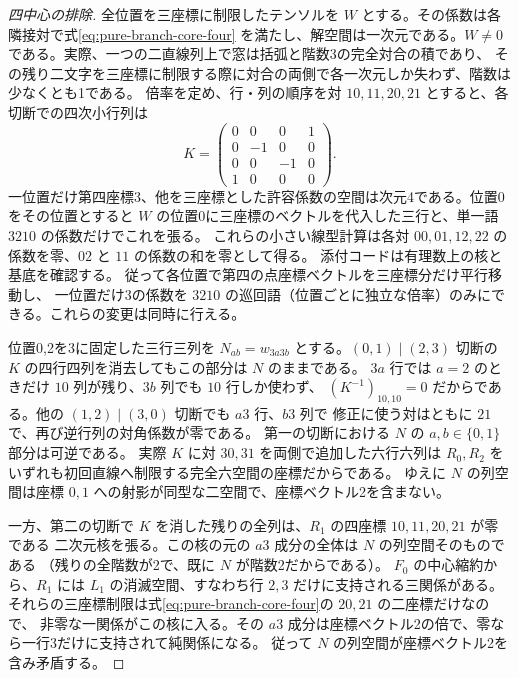 \begin{proof}[四中心の排除]
全位置を三座標に制限したテンソルを $W$ とする。その係数は各隣接対で式\eqref{eq:pure-branch-core-four}
を満たし、解空間は一次元である。$W\ne0$ である。実際、一つの二直線列上で窓は括弧と階数3の完全対合の積であり、
その残り二文字を三座標に制限する際に対合の両側で各一次元しか失わず、階数は少なくとも1である。
倍率を定め、行・列の順序を対 $10,11,20,21$ とすると、各切断での四次小行列は
\[
 K=\begin{pmatrix}0&0&0&1\\0&-1&0&0\\0&0&-1&0\\1&0&0&0\end{pmatrix}.
\]
一位置だけ第四座標3、他を三座標とした許容係数の空間は次元4である。位置0をその位置とすると
$W$ の位置0に三座標のベクトルを代入した三行と、単一語 $3210$ の係数だけでこれを張る。
これらの小さい線型計算は各対 $00,01,12,22$ の係数を零、$02$ と $11$ の係数の和を零として得る。
添付コードは有理数上の核と基底を確認する。
従って各位置で第四の点座標ベクトルを三座標分だけ平行移動し、
一位置だけ3の係数を $3210$ の巡回語（位置ごとに独立な倍率）のみにできる。これらの変更は同時に行える。

位置0,2を3に固定した三行三列を $N_{ab}=w_{3a3b}$ とする。$(0,1)\mid(2,3)$ 切断の
$K$ の四行四列を消去してもこの部分は $N$ のままである。
$3a$ 行では $a=2$ のときだけ $10$ 列が残り、$3b$ 列でも $10$ 行しか使わず、
$(K^{-1})_{10,10}=0$ だからである。他の $(1,2)\mid(3,0)$ 切断でも $a3$ 行、$b3$ 列で
修正に使う対はともに $21$ で、再び逆行列の対角係数が零である。
第一の切断における $N$ の $a,b\in\{0,1\}$ 部分は可逆である。
実際 $K$ に対 $30,31$ を両側で追加した六行六列は
$R_0,R_2$ をいずれも初回直線へ制限する完全六空間の座標だからである。
ゆえに $N$ の列空間は座標 $0,1$ への射影が同型な二空間で、座標ベクトル2を含まない。

一方、第二の切断で $K$ を消した残りの全列は、$R_1$ の四座標 $10,11,20,21$ が零である
二次元核を張る。この核の元の $a3$ 成分の全体は $N$ の列空間そのものである
（残りの全階数が2で、既に $N$ が階数2だからである）。
$F_0$ の中心縮約から、$R_1$ には $L_1$ の消滅空間、すなわち行 $2,3$ だけに支持される三関係がある。
それらの三座標制限は式\eqref{eq:pure-branch-core-four}の $20,21$ の二座標だけなので、
非零な一関係がこの核に入る。その $a3$ 成分は座標ベクトル2の倍で、零なら一行3だけに支持されて純関係になる。
従って $N$ の列空間が座標ベクトル2を含み矛盾する。
\end{proof}

